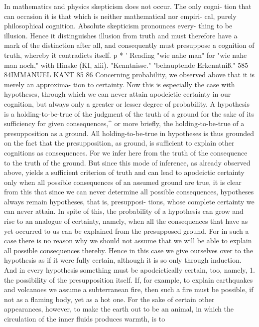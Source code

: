 In mathematics and physics skepticism does not occur. The only cogni-
tion that can occasion it is that which is neither mathematical nor empiri-
cal, purely philosophical cognition. Absolute skepticism pronounces every-
thing to be illusion. Hence it distinguishes illusion from truth and must
therefore have a mark of the distinction after all, and consequently must
presuppose a cognition of truth, whereby it contradicts itself.
p
*
'
Reading "wie nahe man" for "wie nahe man noch," with Hinske (KI, xlii).
"Kenntnisse."
"behauptende Erkenntniß."
585
84IMMANUEL KANT
85
86
Concerning probability, we observed above that it is merely an approxima-
tion to certainty. Now this is especially the case with hypotheses, through
which we can never attain apodeictic certainty in our cognition, but always
only a greater or lesser degree of probability.
A hypothesis is a holding-to-be-true of the judgment of the truth of a ground
for the sake of its sufficiency for given consequences,^ or more briefly, the
holding-to-be-true of a presupposition as a ground.
All holding-to-be-true in hypotheses is thus grounded on the fact that
the presupposition, as ground, is sufficient to explain other cognitions as
consequences. For we infer here from the truth of the consequence to the
truth of the ground. But since this mode of inference, as already observed
above, yields a sufficient criterion of truth and can lead to apodeictic
certainty only when all possible consequences of an assumed ground are
true, it is clear from this that since we can never determine all possible
consequences, hypotheses always remain hypotheses, that is, presupposi-
tions, whose complete certainty we can never attain. In spite of this, the
probability of a hypothesis can grow and rise to an analogue of certainty,
namely, when all the consequences that have as yet occurred to us can be
explained from the presupposed ground. For in such a case there is no
reason why we should not assume that we will be able to explain all
possible consequences thereby. Hence in this case we give ourselves over
to the hypothesis as if it were fully certain, although it is so only through
induction.
And in every hypothesis something must be apodeictically certain, too,
namely,
1. the possibility of the presupposition itself. If, for example, to explain
earthquakes and volcanoes we assume a subterranean fire, then such a
fire must be possible, if not as a flaming body, yet as a hot one. For the
sake of certain other appearances, however, to make the earth out to be an
animal, in which the circulation of the inner fluids produces warmth, is to
